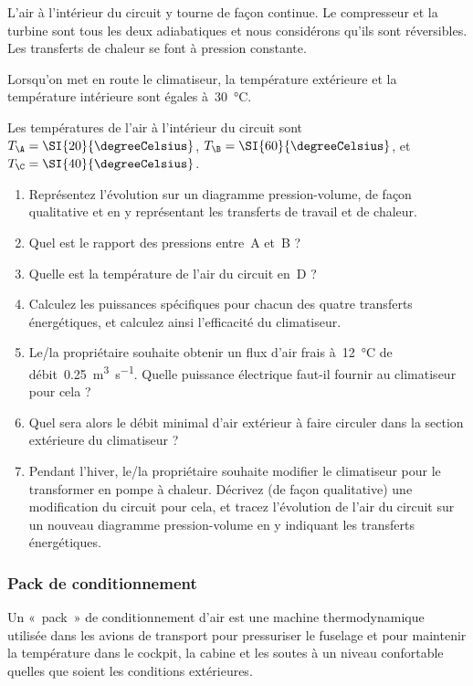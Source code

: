 	L’air à l’intérieur du circuit y tourne de façon continue. Le compresseur et la turbine sont tous les deux adiabatiques et nous considérons qu’ils sont réversibles. Les transferts de chaleur se font à pression constante.

	Lorsqu’on met en route le climatiseur, la température extérieure et la température intérieure sont égales à~\SI{30}{\degreeCelsius}.

	Les températures de l’air à l’intérieur du circuit sont $T_\A = \SI{20}{\degreeCelsius}$, $T_\B = \SI{60}{\degreeCelsius}$, et~$T_\C = \SI{40}{\degreeCelsius}$.

	\begin{enumerate}
		\item Représentez l’évolution sur un diagramme pression-volume, de façon qualitative et en y représentant les transferts de travail et de chaleur.
		\item Quel est le rapport des pressions entre~A et~B ?
		\item Quelle est la température de l’air du circuit en~D ?
		\item Calculez les puissances spécifiques pour chacun des quatre transferts énergétiques, et calculez ainsi l’efficacité du climatiseur.
		\item Le/la propriétaire souhaite obtenir un flux d’air frais à~\SI{12}{\degreeCelsius} de débit~\SI{0,25}{\metre\cubed\per\second}. Quelle puissance électrique faut-il fournir au climatiseur pour cela ?
		\item Quel sera alors le débit minimal d’air extérieur à faire circuler dans la section extérieure du climatiseur ?
		\item Pendant l’hiver, le/la propriétaire souhaite modifier le climatiseur pour le transformer en pompe à chaleur. Décrivez (de façon qualitative) une modification du circuit pour cela, et tracez l’évolution de l’air du circuit sur un nouveau diagramme pression-volume en y indiquant les transferts énergétiques.
	\end{enumerate}


\subsubsection{Pack de conditionnement}
\label{exo_pack_conditonnement}

	Un «~pack~» de conditionnement d’air est une machine thermodynamique utilisée dans les avions de transport pour pressuriser le fuselage et pour maintenir la température dans le cockpit, la cabine et les soutes à un niveau confortable quelles que soient les conditions extérieures.
	
